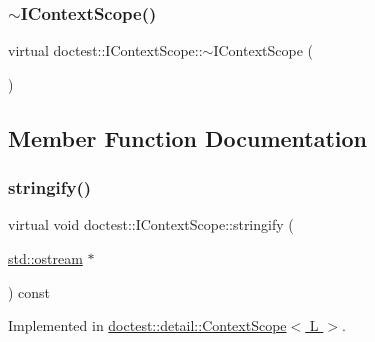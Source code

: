 \mbox{\label{structdoctest_1_1_i_context_scope_aa99357c233d6a040451628bc6a6c6c2e}} 
\subsubsection{\texorpdfstring{$\sim$\+I\+Context\+Scope()}{~IContextScope()}}
{\footnotesize\ttfamily virtual doctest\+::\+I\+Context\+Scope\+::$\sim$\+I\+Context\+Scope (\begin{DoxyParamCaption}{ }\end{DoxyParamCaption})\hspace{0.3cm}{\ttfamily [virtual]}}



\subsection{Member Function Documentation}
\mbox{\label{structdoctest_1_1_i_context_scope_affbf0f9bf8107a4a8a805d237288141d}} 
\subsubsection{\texorpdfstring{stringify()}{stringify()}}
{\footnotesize\ttfamily virtual void doctest\+::\+I\+Context\+Scope\+::stringify (\begin{DoxyParamCaption}\item[{\hyperlink{doctest_8h_a116af65cb5e924b33ad9d9ecd7a783f3}{std\+::ostream} $\ast$}]{ }\end{DoxyParamCaption}) const\hspace{0.3cm}{\ttfamily [pure virtual]}}



Implemented in \hyperlink{classdoctest_1_1detail_1_1_context_scope_a4636ac32ae41ae108c7ada4a164ffaeb}{doctest\+::detail\+::\+Context\+Scope$<$ L $>$}.

